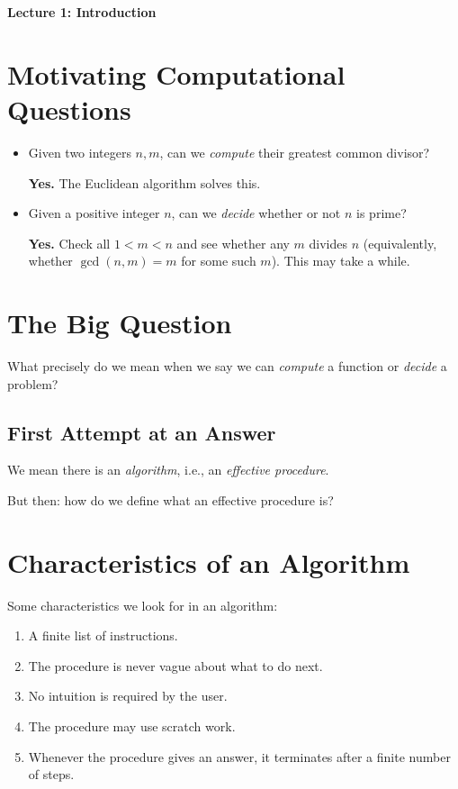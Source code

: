 \documentclass[11pt]{article}
\begin{document}
{\LARGE\bfseries Lecture 1: Introduction}

\section{Motivating Computational Questions}

\begin{itemize}[leftmargin=1.6em]
    \item Given two integers $n,m$, can we \emph{compute} their greatest common divisor?
    
    \textbf{Yes.} The Euclidean algorithm solves this.
    
    \item Given a positive integer $n$, can we \emph{decide} whether or not $n$ is prime?
    
    \textbf{Yes.} Check all $1 < m < n$ and see whether any $m$ divides $n$ (equivalently, whether $\gcd(n,m)=m$ for some such $m$). This may take a while.
\end{itemize}

\section{The Big Question}

What precisely do we mean when we say we can \emph{compute} a function or \emph{decide} a problem?

\subsection{First Attempt at an Answer}

We mean there is an \emph{algorithm}, i.e., an \emph{effective procedure}.

But then: how do we define what an effective procedure is?

\section{Characteristics of an Algorithm}

Some characteristics we look for in an algorithm:

\begin{enumerate}[leftmargin=1.8em, label=\arabic*)]
    \item A finite list of instructions.
    \item The procedure is never vague about what to do next.
    \item No intuition is required by the user.
    \item The procedure may use scratch work.
    \item Whenever the procedure gives an answer, it terminates after a finite number of steps.
\end{enumerate}
\end{document}
